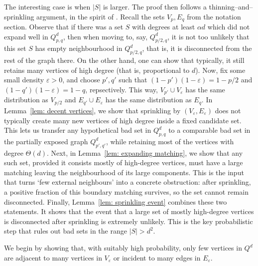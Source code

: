 \documentclass{article}
\theoremstyle{definition}
\newcommand{\eps}{\varepsilon}
\begin{document}
The interesting case is when $|S|$ is larger. The proof then follows a thinning--and--sprinkling argument, in the spirit of \cite{ADLZ25}. Recall the sets $V_p, E_q$ from the notation section. Observe that if there was a set $S$ with degrees at least $\alpha d$ which did not expand well in $Q^d_{p,q}$, then when moving to, say, $Q^d_{p/2,q}$, it is not too unlikely that this set $S$ has empty neighbourhood in $Q^d_{p/2,q}$, that is, it is disconnected from the rest of the graph there. On the other hand, one can show that typically, it still retains many vertices of high degree (that is, proportional to $d$). Now, fix some small density $\eps>0$, and choose $p', q'$ such that $(1-p')(1-\eps)=1-p/2$ and $(1-q')(1-\eps)=1-q$, repsectively. This way, $V_{p'}\cup V_{\eps}$ has the same distribution as $V_{p/2}$ and $E_{q'}\cup E_{\eps}$ has the same distribution as $E_q$. In Lemma~\ref{lem: decent vertices}, we show that sprinkling by $(V_\eps,E_\eps)$ does not typically create many new vertices of high degree inside a fixed candidate set. %
This lets us transfer any hypothetical bad set in $Q^d_{p,q}$ to a comparable bad set in the partially exposed graph $Q^d_{p',q'}$, while retaining most of the vertices with degree $\Theta(d)$. Next, in Lemma~\ref{lem: expanding matching}, we show that any such set, provided it consists mostly of high-degree vertices, must have a large matching leaving the neighbourhood of its large components. This is the input that turns `few external neighbours' into a concrete obstruction: after sprinkling, a positive fraction of this boundary matching survives, so the set cannot remain disconnected. Finally, Lemma~\ref{lem: sprinkling event} combines these two statements. It shows that the event that a large set of mostly high-degree vertices is disconnected after sprinkling is extremely unlikely. This is the key probabilistic step that rules out bad sets in the range $|S|>d^2$.

We begin by showing that, with suitably high probability, only few vertices in $Q^d$ are adjacent to many vertices in $V_\eps$ or incident to many edges in $E_\eps$.
\end{document}
